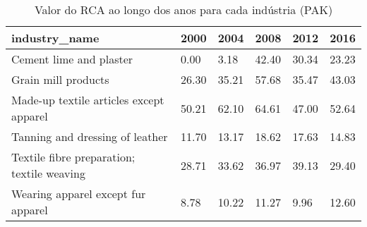 \begin{table}
\centering
\caption{Valor do RCA ao longo dos anos para cada indústria (PAK)}
\begin{tabular}{p{6cm}p{1.5cm}p{1.5cm}p{1.5cm}p{1.5cm}p{1.5cm}}
\toprule
                             industry\_name &  2000 &  2004 &  2008 &  2012 &  2016 \\
\midrule
                   Cement lime and plaster &  0.00 &  3.18 & 42.40 & 30.34 & 23.23 \\
                       Grain mill products & 26.30 & 35.21 & 57.68 & 35.47 & 43.03 \\
   Made-up textile articles except apparel & 50.21 & 62.10 & 64.61 & 47.00 & 52.64 \\
           Tanning and dressing of leather & 11.70 & 13.17 & 18.62 & 17.63 & 14.83 \\
Textile fibre preparation; textile weaving & 28.71 & 33.62 & 36.97 & 39.13 & 29.40 \\
        Wearing apparel except fur apparel &  8.78 & 10.22 & 11.27 &  9.96 & 12.60 \\
\bottomrule
\end{tabular}
\end{table}
